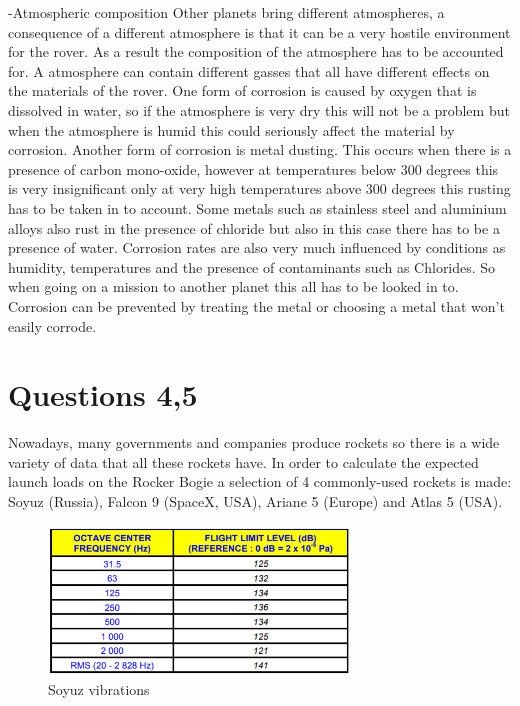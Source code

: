 -Atmospheric composition
Other planets bring different atmospheres, a consequence of a different atmosphere is that it can be a very hostile environment for the rover. As a result the composition of the atmosphere has to be accounted for. A atmosphere can contain different gasses that all have different effects on the materials of the rover. 
One form of corrosion is caused by oxygen that is dissolved in water, so if the atmosphere is very dry this will not be a problem but when the atmosphere is humid this could seriously affect the material by corrosion. 
Another form of corrosion is metal dusting. This occurs when there is a presence of carbon mono-oxide, however at temperatures below 300 degrees this is very insignificant only at very high temperatures above 300 degrees this rusting has to be taken in to account.
Some  metals such as stainless steel and aluminium alloys also rust in the presence of chloride but also in this case there has to be a presence of water. 
Corrosion rates are also very much influenced by conditions as humidity, temperatures and the presence of contaminants such as Chlorides. So when going on a mission to another planet this all has to be looked in to. Corrosion can be prevented by treating the metal or choosing a metal that won't easily corrode.



\section{Questions 4,5}

Nowadays, many governments and companies produce rockets so there is a wide variety of data that all these rockets have. In order to calculate the expected launch loads on the Rocker Bogie a selection of 4 commonly-used rockets is made: Soyuz (Russia), Falcon 9 (SpaceX, USA), Ariane 5 (Europe) and Atlas 5 (USA).

\begin{figure}[h!]
\centering
\includegraphics[width=8cm]{figures/Soyux_vibra.png}
\caption{Soyuz vibrations}
\label{Soyuz vibrations}
\end{figure}

